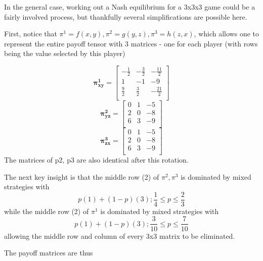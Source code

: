 \documentclass[12pt, a4paper]{article}
\begin{document}
In the general case, working out a Nash equilibrium for a 3x3x3 game could be a fairly involved process, but thankfully several simplifications are possible here.

First, notice that $\pi^1=f(x,y), \pi^2=g(y,z), \pi^3=h(z,x)$, which allows one to represent the entire payoff tensor with 3 matrices - one for each player (with rows being the value selected by this player)

\begin{equation}
    \boldsymbol{\pi_{xy}^1}=\begin{bmatrix}
        -\frac{1}{2} & -\frac{3}{2} & -\frac{11}{2} \\
        1 & -1 & -9 \\
        \frac{9}{2} & \frac{3}{2} & -\frac{21}{2} \\ 
    \end{bmatrix}
\end{equation}
\begin{equation}
    \boldsymbol{\pi_{yz}^2}=\begin{bmatrix}
        0 & 1 & -5 \\
        2 & 0 & -8 \\
        6 & 3 & -9 \\ 
    \end{bmatrix}
\end{equation}
\begin{equation}
    \boldsymbol{\pi_{zx}^3}=\begin{bmatrix}
        0 & 1 & -5 \\
        2 & 0 & -8 \\
        6 & 3 & -9 \\ 
    \end{bmatrix}
\end{equation}
The matrices of p2, p3 are also identical after this rotation.

The next key insight is that the middle row (2) of $\pi^2, \pi^3$ is dominated by mixed strategies with
\begin{equation}
    p(1)+(1-p)(3);\frac{1}{4} \leq p \leq \frac{2}{3}
\end{equation}
while the middle row (2) of $\pi^1$ is dominated by mixed strategies with
\begin{equation}
    p(1)+(1-p)(3);\frac{3}{10} \leq p \leq \frac{7}{10}
\end{equation}
allowing the middle row and column of every 3x3 matrix to be eliminated. 

The payoff matrices are thus
\end{document}
